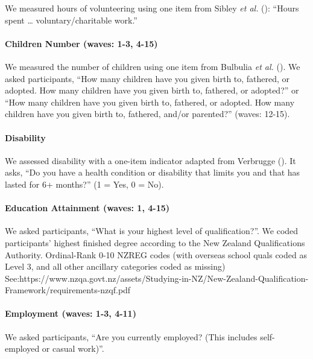 \documentclass[
  single column]{article}
\let\oldparagraph\paragraph
\renewcommand{\paragraph}[1]{\oldparagraph{#1}\mbox{}}
\begin{document}
We measured hours of volunteering using one item from Sibley \emph{et
al.} (): ``Hours spent \ldots{}
voluntary/charitable work.''

\paragraph{Children Number (waves: 1-3,
4-15)}\label{children-number-waves-1-3-4-15}

We measured the number of children using one item from Bulbulia \emph{et
al.} (). We asked participants, ``How
many children have you given birth to, fathered, or adopted. How many
children have you given birth to, fathered, or adopted?'' or ``How many
children have you given birth to, fathered, or adopted. How many
children have you given birth to, fathered, and/or parented?'' (waves:
12-15).

\paragraph{Disability}\label{disability}

We assessed disability with a one-item indicator adapted from Verbrugge
(). It asks, ``Do you have a health
condition or disability that limits you and that has lasted for 6+
months?'' (1 = Yes, 0 = No).

\paragraph{Education Attainment (waves: 1,
4-15)}\label{education-attainment-waves-1-4-15}

We asked participants, ``What is your highest level of qualification?''.
We coded participants' highest finished degree according to the New
Zealand Qualifications Authority. Ordinal-Rank 0-10 NZREG codes (with
overseas school quals coded as Level 3, and all other ancillary
categories coded as missing)
See:https://www.nzqa.govt.nz/assets/Studying-in-NZ/New-Zealand-Qualification-Framework/requirements-nzqf.pdf

\paragraph{Employment (waves: 1-3,
4-11)}\label{employment-waves-1-3-4-11}

We asked participants, ``Are you currently employed? (This includes
self-employed or casual work)''.
\end{document}
